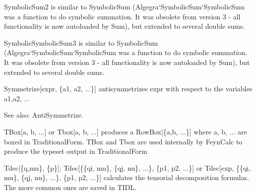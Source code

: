 

SymbolicSum2 is similar to SymbolicSum (Algegra`SymbolicSum`SymbolicSum was a function to do symbolic summation. It was obsolete from
  version 3 - all functionality is now autoloaded by Sum), but extended to several double sums.



SymbolicSymbolicSum3 is similar to SymbolicSum (Algegra`SymbolicSum`SymbolicSum was a function to do symbolic summation. It was obsolete
  from version 3 - all functionality is now autoloaded by Sum), but extended to several double sums.



Symmetrize[expr, \{a1, a2, ...\}] antisymmetrizes expr with respect to the variables a1,a2, ... 

See also: AntiSymmetrize.








TBox[a, b, ...] or Tbox[a, b, ...] produces a RowBox[\{a,b, ...\}] where a, b, ... are boxed in TraditionalForm. TBox and Tbox are used
  internally by FeynCalc to produce the typeset output in TraditionalForm



Tdec[\{q,mu\}, \{p\}]; Tdec[\{\{qi, mu\}, \{qj, nu\}, ...\}, \{p1, p2, ...\}] or Tdec[exp, \{\{qi, mu\}, \{qj, nu\}, ...\}, \{p1, p2,
  ...\}] calculates the tensorial decomposition formulas. The more common ones are saved in TIDL.


